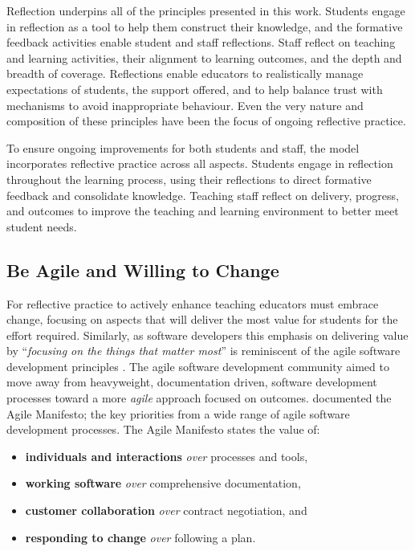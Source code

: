 Reflection underpins all of the principles presented in this work. Students engage in reflection as a tool to help them construct their knowledge, and the formative feedback activities enable student and staff reflections. Staff reflect on teaching and learning activities, their alignment to learning outcomes, and the depth and breadth of coverage. Reflections enable educators to realistically manage expectations of students, the support offered, and to help balance trust with mechanisms to avoid inappropriate behaviour. Even the very nature and composition of these principles have been the focus of ongoing reflective practice.

To ensure ongoing improvements for both students and staff, the model incorporates reflective practice across all aspects. Students engage in reflection throughout the learning process, using their reflections to direct formative feedback and consolidate knowledge. Teaching staff reflect on delivery, progress, and outcomes to improve the teaching and learning environment to better meet student needs.



\subsection{Be Agile and Willing to Change} %
\label{ssub:be_agile_and_willing_to_change}

For reflective practice to actively enhance teaching educators must embrace change, focusing on aspects that will deliver the most value for students for the effort required. Similarly, as software developers this emphasis on delivering value by ``\emph{focusing on the things that matter most}'' is reminiscent of the agile software development principles \cite{Martin:2003}. The agile software development community aimed to move away from heavyweight, documentation driven, software development processes toward a more \emph{agile} approach focused on outcomes. \citet{Beck:2001} documented the Agile Manifesto; the key priorities from a wide range of agile software development processes. The Agile Manifesto states the value of: 

\begin{itemize}[noitemsep,nolistsep]
	\item \textbf{individuals and interactions} \emph{over} processes and tools,
	\item \textbf{working software} \emph{over} comprehensive documentation,
	\item \textbf{customer collaboration} \emph{over} contract negotiation, and
	\item \textbf{responding to change} \emph{over} following a plan.
\end{itemize}

